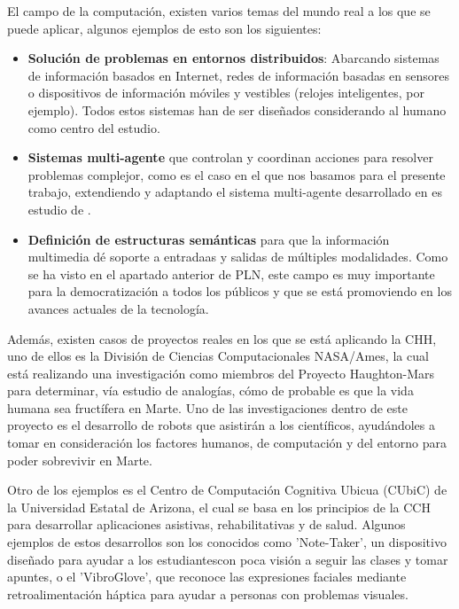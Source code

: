 El campo de la computación, existen varios temas del mundo real a los que se puede aplicar, algunos ejemplos de esto son los siguientes:

\begin{itemize}
	\item \textbf{Solución de problemas en entornos distribuidos}: Abarcando sistemas de información basados en Internet, redes de información basadas en sensores o dispositivos de información móviles y vestibles (relojes inteligentes, por ejemplo). Todos estos sistemas han de ser diseñados considerando al humano como centro del estudio.
	
	\item \textbf{Sistemas multi-agente} que controlan y coordinan acciones para resolver problemas complejor, como es el caso en el que nos basamos para el presente trabajo, extendiendo y adaptando el sistema multi-agente desarrollado en es estudio de \cite{park2023generative}.
	
	\item \textbf{Definición de estructuras semánticas} para que la información multimedia dé soporte a entradaas y salidas de múltiples modalidades. Como se ha visto en el apartado anterior de PLN, este campo es muy importante para la democratización a todos los públicos y que se está promoviendo en los avances actuales de la tecnología.
	
\end{itemize}

Además, existen casos de proyectos reales en los que se está aplicando la CHH, uno de ellos es la División de Ciencias Computacionales NASA/Ames, la cual está realizando una investigación como miembros del Proyecto Haughton-Mars para determinar, vía estudio de analogías, cómo de probable es que la vida humana sea fructífera en Marte. Uno de las investigaciones dentro de este proyecto es el desarrollo de robots que asistirán a los científicos, ayudándoles a tomar en consideración los factores humanos, de computación y del entorno para poder sobrevivir en Marte.

Otro de los ejemplos es el Centro de Computación Cognitiva Ubicua (CUbiC) de la Universidad Estatal de Arizona, el cual se basa en los principios de la CCH para desarrollar aplicaciones asistivas, rehabilitativas y de salud. Algunos ejemplos de estos desarrollos son los conocidos como 'Note-Taker', un dispositivo diseñado para ayudar a los estudiantescon poca visión a seguir las clases y tomar apuntes, o el 'VibroGlove', que reconoce las expresiones faciales mediante retroalimentación háptica para ayudar a personas con problemas visuales.

